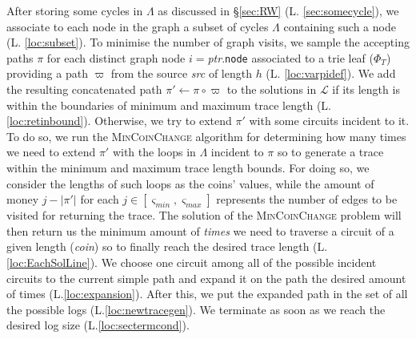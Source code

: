 \documentclass[sigconf]{acmart}
\newcommand{\smin}{\ensuremath{\varsigma_\textit{min}}}
\newcommand{\smax}{\ensuremath{\varsigma_\textit{max}}}
\begin{document}
After storing some cycles in $\Lambda$ as discussed in \S\ref{sec:RW} (L. \ref{sec:somecycle}), we associate to each node in the graph a subset of cycles $\Lambda$ containing such a node (L. \ref{loc:subset}). To minimise the number of graph visits, we sample the accepting paths $\pi$ for each distinct graph node $i=$\textit{ptr}.\texttt{node} associated to a trie leaf ($\Phi_T$) providing a path $\varpi$ from the source \textit{src} of length $h$ (L. \ref{loc:varpidef}). We add the resulting  concatenated path $\pi'\gets\pi\circ\varpi$ to the solutions in $\mathcal{L}$ if its length is within the boundaries of minimum and maximum trace length (L. \ref{loc:retinbound}). Otherwise, we try to extend $\pi'$ with some circuits incident to it. To do so, we run the \textsc{MinCoinChange} algorithm for determining how many times we need to extend $\pi'$ with the loops in $\Lambda$ incident to $\pi$ so to generate a trace within the minimum and maximum trace length bounds. For doing so, we consider the lengths of such loops as the coins' values, while the amount of money $j-|\pi'|$  for each $j\in [\smin,\smax]$ represents the number of edges to be visited for returning the trace. The solution of the \textsc{MinCoinChange} problem will then return us the minimum amount of \textit{times} we need to traverse a circuit of a given length (\textit{coin}) so to finally reach the desired trace length (L.\ref{loc:EachSolLine}). We choose one circuit among all of the possible incident circuits to the current simple path and expand it on the path the desired amount of times (L.\ref{loc:expansion}). After this, we put the expanded path in the set of all the possible logs (L.\ref{loc:newtracegen}). We terminate as soon as we reach the desired log size (L.\ref{loc:sectermcond}).

 
\end{document}
